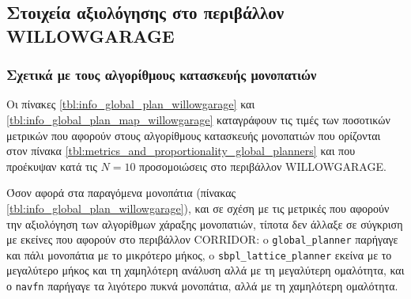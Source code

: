 \subsection{Στοιχεία αξιολόγησης στο περιβάλλον WILLOWGARAGE}
\label{appendix:evaluation_willowgarage}

\subsubsection{Σχετικά με τους αλγορίθμους κατασκευής μονοπατιών}

Οι πίνακες \ref{tbl:info_global_plan_willowgarage}
και \ref{tbl:info_global_plan_map_willowgarage} καταγράφουν τις τιμές
των ποσοτικών μετρικών που αφορούν στους αλγορίθμους κατασκευής μονοπατιών που
ορίζονται στον πίνακα \ref{tbl:metrics_and_proportionality_global_planners} και
που προέκυψαν κατά τις $N = 10$ προσομοιώσεις στο περιβάλλον WILLOWGARAGE.

Όσον αφορά στα παραγόμενα μονοπάτια (πίνακας
\ref{tbl:info_global_plan_willowgarage}), και σε σχέση με τις μετρικές που
αφορούν την αξιολόγηση των αλγορίθμων χάραξης μονοπατιών, τίποτα δεν άλλαξε σε
σύγκριση με εκείνες που αφορούν στο περιβάλλον CORRIDOR: o
\texttt{global\_planner} παρήγαγε και πάλι μονοπάτια με το μικρότερο μήκος, o
\texttt{sbpl\_lattice\_planner} εκείνα με το μεγαλύτερο μήκος και τη χαμηλότερη
ανάλυση αλλά με τη μεγαλύτερη ομαλότητα, και ο \texttt{navfn} παρήγαγε τα
λιγότερο πυκνά μονοπάτια, αλλά με τη χαμηλότερη ομαλότητα.

